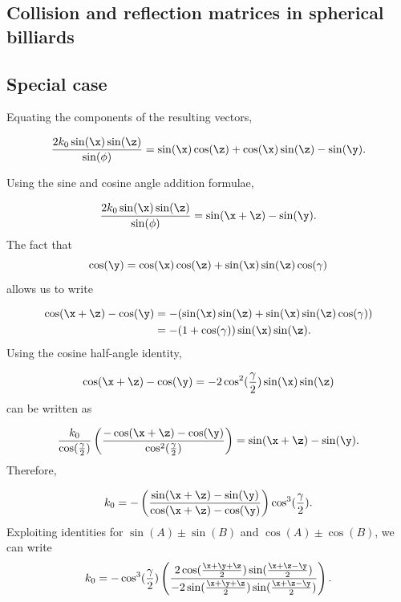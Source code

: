 \documentclass[11pt]{article}
\theoremstyle{plain}
\theoremstyle{definition}
\begin{document}
\subsection{Collision and reflection matrices in spherical billiards}
\subsection{Special case}
Equating the components of the resulting vectors,


\begin{equation*}
\frac{2k_0\sin(\x)\sin(\z)}{\sin(\phi)}=\sin(\x)\cos(\z)+\cos(\x)\sin(\z)-\sin(\y).
\end{equation*}

Using the sine and cosine angle addition formulae,


\begin{equation*}
\frac{2k_0\sin(\x)\sin(\z)}{\sin(\phi)}=\sin(\x+\z)-\sin(\y).
\end{equation*}
The fact that
\begin{equation*}
\cos(\y)=\cos(\x)\cos(\z)+\sin(\x)\sin(\z)\cos(\gamma)
\end{equation*}
allows us to write

\begin{equation*}\begin{split}
\cos(\x+\z)-\cos(\y)&=-(\sin(\x)\sin(\z)+\sin(\x)\sin(\z)\cos(\gamma)) \\
&=-(1+\cos(\gamma))\sin(\x)\sin(\z).
\end{split}
\end{equation*}
Using the cosine half-angle identity,

\begin{equation*}
\cos(\x+\z)-\cos(\y)=-2\cos^2(\frac{\gamma}{2})\sin(\x)\sin(\z)
\end{equation*}
can be written as

\begin{equation*}
\frac{k_0}{\cos(\frac{\gamma}{2})}\left(\frac{-\cos(\x+\z)-\cos(\y)}{\cos^2(\frac{\gamma}{2})} \right)=\sin(\x+\z)-\sin(\y).
\end{equation*}
Therefore,

\begin{equation*}
k_0=-\left( \frac{\sin(\x+\z)-\sin(\y)}{\cos(\x+\z)-\cos(\y)}\right)\cos^3(\frac{\gamma}{2}).
\end{equation*}
Exploiting identities for $\sin(A)\pm \sin(B)$ and $\cos(A)\pm\cos(B)$, we can write
\begin{equation*}
k_0=-\cos^3(\frac{\gamma}{2})\left(\frac{2\cos(\frac{\x+\y+\z}{2})\sin(\frac{\x+\z-\y}{2})}{-2\sin(\frac{\x+\y+\z}{2})\sin(\frac{\x+\z-\y}{2})} \right).
\end{equation*}
\end{document}
